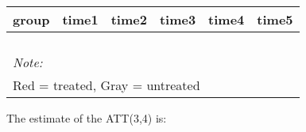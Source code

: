 \documentclass[
]{article}
\begin{document}
\begin{table}
\centering
\begin{tabular}[t]{>{}r|>{}r|>{}r|>{}r|>{}r|>{}r}
\hline
group & time1 & time2 & time3 & time4 & time5\\
\hline
\cellcolor{white}{2} & \cellcolor{white}{0.631} & \cellcolor{white}{\textcolor{black}{0.711}} & \cellcolor{white}{0.814} & \cellcolor{white}{\textcolor{black}{0.846}} & \cellcolor{white}{0.826}\\
\hline
\cellcolor{white}{3} & \cellcolor{white}{0.678} & \cellcolor{red}{\textcolor{black}{0.770}} & \cellcolor{white}{0.664} & \cellcolor{red}{\textcolor{black}{0.800}} & \cellcolor{white}{0.784}\\
\hline
\cellcolor{white}{4} & \cellcolor{white}{0.778} & \cellcolor{white}{\textcolor{black}{0.807}} & \cellcolor{white}{0.673} & \cellcolor{white}{\textcolor{black}{0.750}} & \cellcolor{white}{0.868}\\
\hline
\cellcolor{white}{5} & \cellcolor{white}{0.854} & \cellcolor{lightgray}{\textcolor{black}{0.939}} & \cellcolor{white}{0.854} & \cellcolor{lightgray}{\textcolor{black}{0.800}} & \cellcolor{white}{0.855}\\
\hline
\multicolumn{6}{l}{\rule{0pt}{1em}\textit{Note: }}\\
\multicolumn{6}{l}{\rule{0pt}{1em}Red = treated, Gray = untreated}\\
\end{tabular}
\end{table}

The estimate of the ATT(3,4) is:
\end{document}
